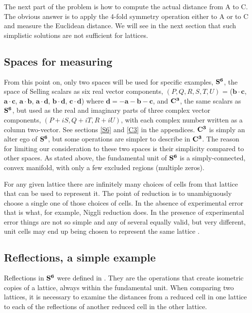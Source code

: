 \documentclass[preprint]{iucr}              %
\numberwithin{equation}{section}
\newcommand{\SVI}[0]{$\bf{S^{6}}$}
\newcommand{\CIII}[0]{$\bf{C^{3}}$}
\begin{document}
	The next part of the problem is how to compute the actual 
	distance from A to C. The obvious answer is to apply the 
	4-fold symmetry operation either to A or to C and measure
	the Euclidean distance. We will see in the next section that
	such simplistic solutions are not sufficient for lattices.
	
	\subsection{Spaces for measuring}
	
	From this point on, only two spaces will be used for
	specific examples, \SVI{}, the
	space of Selling scalars as six real vector components,
	$( P,Q,R,S,T,U )$ = 
	({$\mathbf{b} \cdot \mathbf{c}$},
	{$\mathbf{a} \cdot \mathbf{c}$},
	{$\mathbf{a} \cdot \mathbf{b}$},
	{$\mathbf{a} \cdot \mathbf{d}$},
	{$\mathbf{b} \cdot \mathbf{d}$},
	{$\mathbf{c} \cdot \mathbf{d}$}) where {$\mathbf{d}=-\mathbf{a}-\mathbf{b}-\mathbf{c}$}, 
	 and \CIII{}, the same scalars as \SVI{}, but used as the real and imaginary parts
	of three complex vector components, $(P+iS, Q+iT, R+iU)$, with each complex number written as a column two-vector.  See sections \ref{S6} and
	\ref{C3} in the appendices. \CIII{} is simply an alter ego of \SVI{}, but 
	some operations are simpler to describe in \CIII{}. The
	reason for limiting our consideration to these two spaces is their simplicity
	compared to other spaces. As stated above, the fundamental
	unit of \SVI{} is a simply-connected, convex manifold, with
	only a few excluded regions (multiple zeros).
	
	For any given lattice there are infinitely many choices of cells from that lattice that can be used to represent it.  The point of reduction is to unambiguously choose a single one of those choices of cells.  In the absence of
	experimental error that is what, for example, Niggli reduction does.  In the presence of experimental error things are not
	so simple and any of several equally valid,
	but very different, unit cells may end up being chosen
	to represent the same lattice \cite{Gruber1973} \cite{McGill2014}.
	
		
	\subsection{Reflections, a simple example}
	
	Reflections in \SVI{} were defined in . They are
	the operations that create isometric copies of a lattice, always within the
	fundamental unit. When comparing two lattices, it is necessary to 
	examine the distances from a reduced cell in one lattice to each of the reflections of another reduced cell in the other lattice.
	
\end{document}
